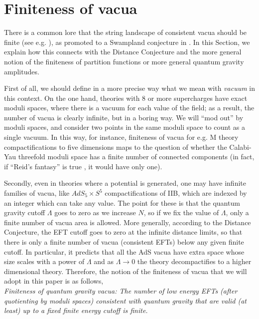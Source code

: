 \documentclass[11pt]{article}
\numberwithin{equation}{section}
\numberwithin{equation}{section}
\theoremstyle{remark}
\begin{document}
\section{Finiteness of vacua} \label{sec:vacua}



There is a common lore that the string landscape of consistent vacua should be finite (see e.g. \cite{Acharya:2006zw}), as promoted to a Swampland conjecture in \cite{Vafa:2005ui}. In this Section, we explain how this connects with the Distance Conjecture and the more general notion of the finiteness of partition functions or more general quantum gravity amplitudes.

First of all, we should define in a more precise way what we mean with \emph{vacuum} in this context. On the one hand, theories with  8 or more supercharges have exact moduli spaces, where there is a vacuum for each value of the field; as a result, the number of vacua is clearly infinite, but in a boring way. We will ``mod out'' by moduli spaces, and consider two points in the same moduli space to count as a single vacuum. In this way, for instance, finiteness of vacua for e.g. M theory compactifications to five dimensions maps to the question of whether the Calabi-Yau threefold moduli space has a finite number of connected components (in fact, if ``Reid's fantasy'' is true \cite{Reid}, it would have only one).

Secondly, even in theories where a potential is generated, one may have infinite families of vacua, like $AdS_5\times S^5$ compactifications of IIB, which are indexed by an integer which can take any value. The point for these is that the quantum gravity cutoff $\Lambda$ goes to zero as we increase $N$, so if we fix the value of $\Lambda$, only a finite number of vacua area is allowed. More generally, according to the Distance Conjecture, the EFT cutoff goes to zero at the infinite distance limits, so that there is only a finite number of vacua (consistent EFTs) below any given finite cutoff.  In particular, it predicts \cite{Lust:2019zwm} that all the AdS vacua have extra space whose size scales with a power of $\Lambda$ and as $\Lambda \rightarrow 0$ the theory decompactifies to a higher dimensional theory. Therefore, the notion of the finiteness of vacua that we will adopt in this paper is as follows,\\

\emph{Finiteness of quantum gravity vacua: The number of low energy EFTs (after quotienting by moduli spaces) consistent with quantum gravity that are valid (at least) up to a fixed finite energy cutoff is finite.  }\\
\end{document}
